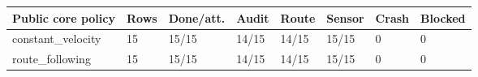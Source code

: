 \begin{tabular}{llllllll}
\toprule
Public core policy & Rows & Done/att. & Audit & Route & Sensor & Crash & Blocked \\
\midrule
constant\_velocity & 15 & 15/15 & 14/15 & 14/15 & 15/15 & 0 & 0 \\
route\_following & 15 & 15/15 & 14/15 & 14/15 & 15/15 & 0 & 0 \\
\bottomrule
\end{tabular}
